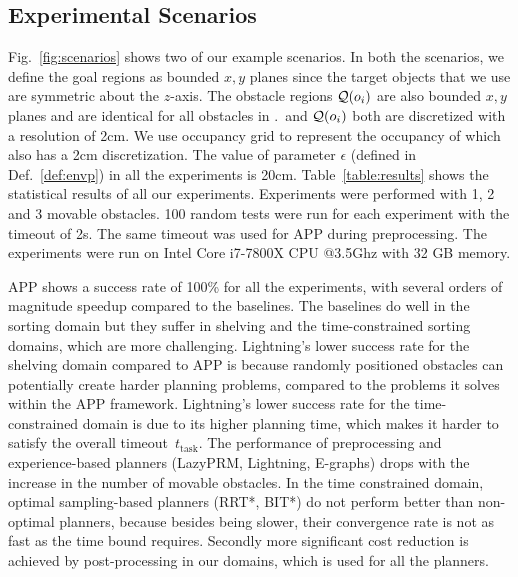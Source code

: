 \documentclass[a4paper]{report}
\begin{document}
\subsection{Experimental Scenarios}
Fig.~\ref{fig:scenarios} shows two of our example scenarios. In both the scenarios, we define the goal regions \calG as bounded $x,y$ planes since the target objects that we use are symmetric about the $z$-axis. The obstacle regions $\mathcal{Q}(o_i)$ are also bounded $x,y$ planes and are identical for all obstacles in \calO.~\calG and $\mathcal{Q}(o_i)$ both are discretized with a resolution of 2cm. We use occupancy grid to represent the occupancy of \calW which also has a 2cm discretization. The value of parameter $\epsilon$ (defined in Def.~\ref{def:envp}) in all the experiments is 20cm.
%
%
Table~\ref{table:results} shows the statistical results of all our experiments. Experiments were performed with 1, 2 and 3 movable obstacles. 100 random tests were run for each experiment with the timeout of 2s. The same timeout was used for APP during preprocessing. The experiments were run on Intel Core i7-7800X CPU @3.5Ghz with 32 GB memory.

APP shows a success rate of 100\% for all the experiments, with several orders of magnitude speedup compared to the baselines. The baselines do well in the sorting domain but they suffer in shelving and the time-constrained sorting domains, which are more challenging.
%
Lightning's lower success rate for the shelving domain compared to APP is because randomly positioned obstacles can potentially create harder planning problems, compared to the problems it solves within the APP framework.
%
Lightning's lower success rate for the time-constrained domain is due to its higher planning time, which makes it harder to satisfy the overall timeout~$t_\textrm{task}$.
%
%
The performance of preprocessing and experience-based planners (LazyPRM, Lightning, E-graphs) drops with the increase in the number of movable obstacles.
%
In the time constrained domain, optimal sampling-based planners (RRT*, BIT*) do not perform better than non-optimal planners, because besides being slower, their convergence rate is not as fast as the time bound requires. Secondly more significant cost reduction is achieved by post-processing in our domains, which is used for all the planners.
\end{document}
